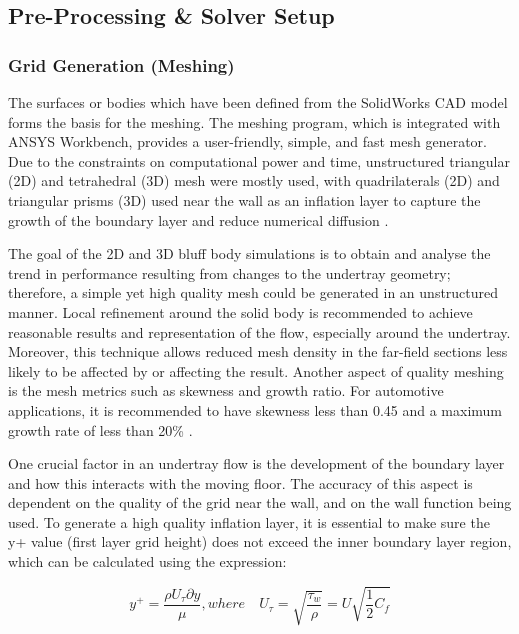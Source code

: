 \subsection{Pre-Processing \& Solver Setup}

\subsubsection{Grid Generation (Meshing)}
\noindent The surfaces or bodies which have been defined from the SolidWorks CAD model forms the basis for the meshing. The meshing program, which is integrated with ANSYS Workbench, provides a user-friendly, simple, and fast mesh generator. Due to the constraints on computational power and time, unstructured triangular (2D) and tetrahedral (3D) mesh were mostly used, with quadrilaterals (2D) and triangular prisms (3D) used near the wall as an inflation layer to capture the growth of the boundary layer and reduce numerical diffusion \cite{Lanfrit2005BestFLUENT}.

\noindent The goal of the 2D and 3D bluff body simulations is to obtain and analyse the trend in performance resulting from changes to the undertray geometry; therefore, a simple yet high quality mesh could be generated in an unstructured manner. Local refinement around the solid body is recommended \cite{Lanfrit2005BestFLUENT} to achieve reasonable results and representation of the flow, especially around the undertray. Moreover, this technique allows reduced mesh density in the far-field sections less likely to be affected by or affecting the result. Another aspect of quality meshing is the mesh metrics such as skewness and growth ratio. For automotive applications, it is recommended to have skewness less than 0.45 and a maximum growth rate of less than 20\% \cite{Lanfrit2005BestFLUENT}. 

\noindent One crucial factor in an undertray flow is the development of the boundary layer and how this interacts with the moving floor. The accuracy of this aspect is dependent on the quality of the grid near the wall, and on the wall function being used. To generate a high quality inflation layer, it is essential to make sure the y+ value (first layer grid height) does not exceed the inner boundary layer region, which can be calculated using the expression:

\begin{equation}
    y^+ = \frac{\rho U_\tau \partial y}{\mu}, where \quad U_\tau = \sqrt{\frac{\tau_w}{\rho}} = U \sqrt{\frac{1}{2}C_f}
\end{equation}

